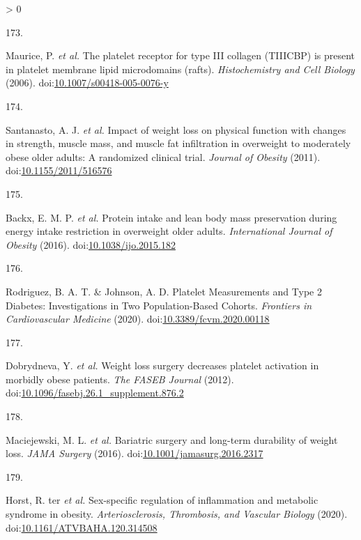 \documentclass[11pt,twoside]{bristolthesis}
\newlength{\cslhangindent}
\newlength{\csllabelwidth}
\newenvironment{CSLReferences}[2] %
 {%
  \setlength{\parindent}{0pt}
  \ifodd #1 \everypar{\setlength{\hangindent}{\cslhangindent}}\ignorespaces\fi
  \ifnum #2 > 0
  \setlength{\parskip}{#2\baselineskip}
  \fi
 }%
 {}
\newcommand{\CSLLeftMargin}[1]{\parbox[t]{\csllabelwidth}{#1}}
\newcommand{\CSLRightInline}[1]{\parbox[t]{\linewidth - \csllabelwidth}{#1}\break}
\begin{document}
\begin{CSLReferences}{0}{0}
\leavevmode\hypertarget{ref-Maurice2006}{}%
\CSLLeftMargin{173. }
\CSLRightInline{Maurice, P. \emph{et al.} {The platelet receptor for type III collagen (TIIICBP) is present in platelet membrane lipid microdomains (rafts)}. \emph{Histochemistry and Cell Biology} (2006). doi:\href{https://doi.org/10.1007/s00418-005-0076-y}{10.1007/s00418-005-0076-y}}

\leavevmode\hypertarget{ref-Santanasto2011}{}%
\CSLLeftMargin{174. }
\CSLRightInline{Santanasto, A. J. \emph{et al.} {Impact of weight loss on physical function with changes in strength, muscle mass, and muscle fat infiltration in overweight to moderately obese older adults: A randomized clinical trial}. \emph{Journal of Obesity} (2011). doi:\href{https://doi.org/10.1155/2011/516576}{10.1155/2011/516576}}

\leavevmode\hypertarget{ref-Backx2016}{}%
\CSLLeftMargin{175. }
\CSLRightInline{Backx, E. M. P. \emph{et al.} {Protein intake and lean body mass preservation during energy intake restriction in overweight older adults}. \emph{International Journal of Obesity} (2016). doi:\href{https://doi.org/10.1038/ijo.2015.182}{10.1038/ijo.2015.182}}

\leavevmode\hypertarget{ref-Rodriguez2020}{}%
\CSLLeftMargin{176. }
\CSLRightInline{Rodriguez, B. A. T. \& Johnson, A. D. {Platelet Measurements and Type 2 Diabetes: Investigations in Two Population-Based Cohorts}. \emph{Frontiers in Cardiovascular Medicine} (2020). doi:\href{https://doi.org/10.3389/fcvm.2020.00118}{10.3389/fcvm.2020.00118}}

\leavevmode\hypertarget{ref-Dobrydneva2012}{}%
\CSLLeftMargin{177. }
\CSLRightInline{Dobrydneva, Y. \emph{et al.} {Weight loss surgery decreases platelet activation in morbidly obese patients}. \emph{The FASEB Journal} (2012). doi:\href{https://doi.org/10.1096/fasebj.26.1_supplement.876.2}{10.1096/fasebj.26.1\_supplement.876.2}}

\leavevmode\hypertarget{ref-Maciejewski2016}{}%
\CSLLeftMargin{178. }
\CSLRightInline{Maciejewski, M. L. \emph{et al.} {Bariatric surgery and long-term durability of weight loss}. \emph{JAMA Surgery} (2016). doi:\href{https://doi.org/10.1001/jamasurg.2016.2317}{10.1001/jamasurg.2016.2317}}

\leavevmode\hypertarget{ref-TerHorst2020}{}%
\CSLLeftMargin{179. }
\CSLRightInline{Horst, R. ter \emph{et al.} {Sex-specific regulation of inflammation and metabolic syndrome in obesity}. \emph{Arteriosclerosis, Thrombosis, and Vascular Biology} (2020). doi:\href{https://doi.org/10.1161/ATVBAHA.120.314508}{10.1161/ATVBAHA.120.314508}}


\end{CSLReferences}
\end{document}
